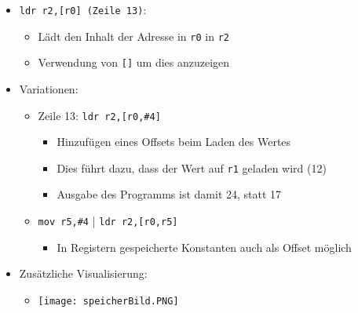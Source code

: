 \begin{itemize}
\begin{itemize}
                \item \texttt{ldr r2,[r0] (Zeile 13)}:
                    \begin{itemize}
                        \item Lädt den Inhalt der Adresse in \texttt{r0} in \texttt{r2}
                        \item Verwendung von \texttt{[]} um dies anzuzeigen
                    \end{itemize}

                \item Variationen:
                    \begin{itemize}
                        \item Zeile 13: \texttt{ldr r2,[r0,\#4]}
                            \begin{itemize}
                                \item Hinzufügen eines Offsets beim Laden des Wertes 
                                \item Dies führt dazu, dass der Wert auf \texttt{r1} geladen wird (12)
                                \item Ausgabe des Programms ist damit 24, statt 17
                            \end{itemize}
                        \item \texttt{mov r5,\#4} | \texttt{ldr r2,[r0,r5]}
                            \begin{itemize}
                                \item In Registern gespeicherte Konstanten auch als Offset möglich
                            \end{itemize}
                    \end{itemize}

                \item Zusätzliche Visualisierung:
                    \begin{itemize}
                        \item[] \texttt{[image: speicherBild.PNG]}
                    \end{itemize}
            \end{itemize}
    \end{itemize}

